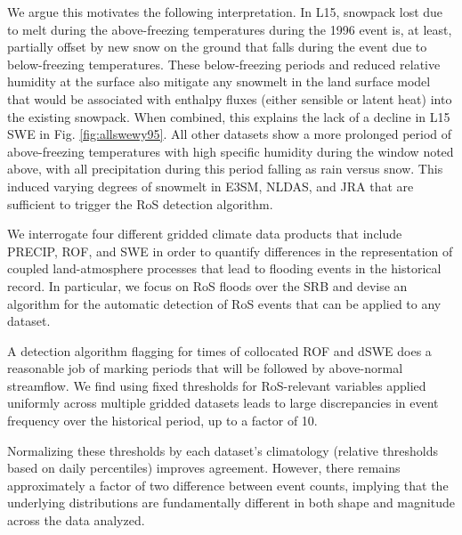 \documentclass[nhess, manuscript]{copernicus}
\begin{document}
We argue this motivates the following interpretation.
In L15, snowpack lost due to melt during the above-freezing temperatures during the 1996 event is, at least, partially offset by new snow on the ground that falls during the event due to below-freezing temperatures.
These below-freezing periods and reduced relative humidity at the surface also mitigate any snowmelt in the land surface model that would be associated with enthalpy fluxes (either sensible or latent heat) into the existing snowpack.
When combined, this explains the lack of a decline in L15 SWE in Fig. \ref{fig:allswewy95}.
All other datasets show a more prolonged period of above-freezing temperatures with high specific humidity during the window noted above, with all precipitation during this period falling as rain versus snow.
This induced varying degrees of snowmelt in E3SM, NLDAS, and JRA that are sufficient to trigger the RoS detection algorithm.

\conclusions

We interrogate four different gridded climate data products that include PRECIP, ROF, and SWE in order to quantify differences in the representation of coupled land-atmosphere processes that lead to flooding events in the historical record.
In particular, we focus on RoS floods over the SRB and devise an algorithm for the automatic detection of RoS events that can be applied to any dataset.

A detection algorithm flagging for times of collocated ROF and dSWE does a reasonable job of marking periods that will be followed by above-normal streamflow.
We find using fixed thresholds for RoS-relevant variables applied uniformly across multiple gridded datasets leads to large discrepancies in event frequency over the historical period, up to a factor of 10.

Normalizing these thresholds by each dataset's climatology (relative thresholds based on daily percentiles) improves agreement.
However, there remains approximately a factor of two difference between event counts, implying that the underlying distributions are fundamentally different in both shape and magnitude across the data analyzed.

\end{document}

